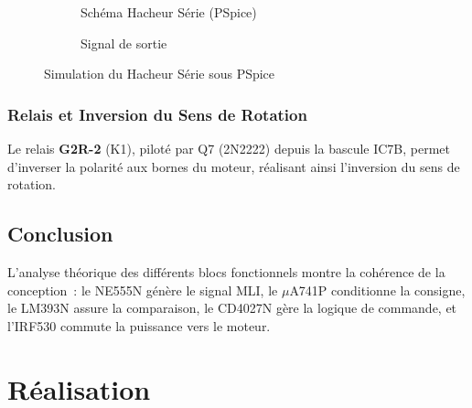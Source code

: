 \documentclass[a4paper,12pt,openany]{book}
\begin{document}
\begin{figure}[H]
  \centering
  \begin{subfigure}[b]{0.52\textwidth}
    \centering
    \caption{Sch\'ema Hacheur S\'erie (PSpice)}
  \end{subfigure}
  \hfill
  \begin{subfigure}[b]{0.44\textwidth}
    \centering
    \caption{Signal de sortie}
  \end{subfigure}
  \caption{Simulation du Hacheur S\'erie sous PSpice}
  \label{fig:hacheur_serie}
\end{figure}

\subsection{Relais et Inversion du Sens de Rotation}

Le relais \textbf{G2R-2} (K1), pilot\'e par Q7 (2N2222) depuis la bascule
IC7B, permet d'inverser la polarit\'e aux bornes du moteur, r\'ealisant
ainsi l'inversion du sens de rotation.

\section{Conclusion}

L'analyse th\'eorique des diff\'erents blocs fonctionnels montre la
coh\'erence de la conception~: le NE555N g\'en\`ere le signal MLI, le
$\mu$A741P conditionne la consigne, le LM393N assure la comparaison, le
CD4027N g\`ere la logique de commande, et l'IRF530 commute la puissance
vers le moteur.

\chapter{R\'ealisation}
\end{document}
